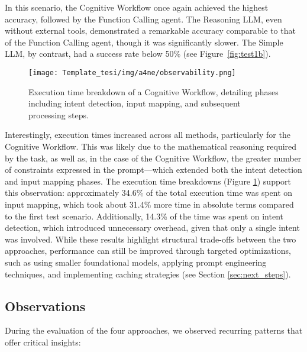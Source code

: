 In this scenario, the Cognitive Workflow once again achieved the highest accuracy, followed by the Function Calling agent. The Reasoning LLM, even without external tools, demonstrated a remarkable accuracy comparable to that of the Function Calling agent, though it was significantly slower. The Simple LLM, by contrast, had a success rate below 50\% (see Figure~\ref{fig:test1b}). 




\begin{figure}[h]
    \centering
    \texttt{[image: Template\_tesi/img/a4ne/observability.png]}
    \caption{Execution time breakdown of a Cognitive Workflow, detailing phases including intent detection, input mapping, and subsequent processing steps.}
    \label{fig:time-breakdown} 
\end{figure}


Interestingly, execution times increased across all methods, particularly for the Cognitive Workflow. This was likely due to the mathematical reasoning required by the task, as well as, in the case of the Cognitive Workflow, the greater number of constraints expressed in the prompt—which extended both the intent detection and input mapping phases. The execution time breakdowns (Figure \ref{fig:time-breakdown}) support this observation: approximately 34.6\% of the total execution time was spent on input mapping, which took about 31.4\% more time in absolute terms compared to the first test scenario. Additionally, 14.3\% of the time was spent on intent detection, which introduced unnecessary overhead, given that only a single intent was involved. While these results highlight structural trade-offs between the two approaches, performance can still be improved through targeted optimizations, such as using smaller foundational models, applying prompt engineering techniques, and implementing caching strategies (see Section \ref{sec:next_steps}).




\subsection{Observations}
During the evaluation of the four approaches, we observed recurring patterns that offer critical insights:


